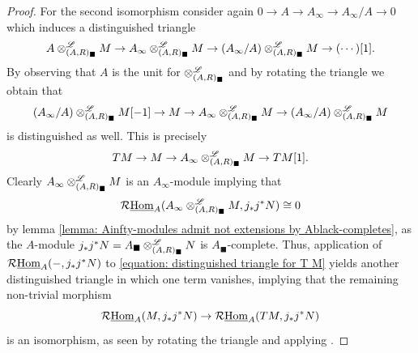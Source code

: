 \begin{proof}
	
	For the second isomorphism consider again $0\to A\to A_\infty\to A_\infty/A \to 0$ which induces a distinguished triangle
	$$A\otimes^{\mathscr{L}}_{(A, R)_\blacksquare} M\to A_\infty\otimes^{\mathscr{L}}_{(A, R)_\blacksquare} M \to (A_\infty/A) \otimes^{\mathscr{L}}_{(A, R)_\blacksquare} M \to (\cdots)[1].$$
	By observing that $A$ is the unit for $\otimes^{\mathscr{L}}_{(A, R)_\blacksquare}$ and by rotating the triangle we obtain that
	$$(A_\infty/A) \otimes^{\mathscr{L}}_{(A, R)_\blacksquare} M[-1] \to M \to A_\infty\otimes^{\mathscr{L}}_{(A, R)_\blacksquare} M \to (A_\infty/A) \otimes^{\mathscr{L}}_{(A, R)_\blacksquare} M$$
	is distinguished as well. This is precisely
	\begin{equation}
		\label{equation: distinguished triangle for T M}
		T M \to M \to A_\infty\otimes^{\mathscr{L}}_{(A, R)_\blacksquare} M \to T M[1].
	\end{equation}
	Clearly $A_\infty\otimes^{\mathscr{L}}_{(A, R)_\blacksquare} M$ is an $A_\infty$-module implying that
	$$\mathcal{R}{\underline{\operatorname{Hom}}}_A(A_\infty\otimes^{\mathscr{L}}_{(A, R)_\blacksquare} M, j_\ast j^\ast N)\cong 0$$
	by lemma \ref{lemma: Ainfty-modules admit not extensions by Ablack-completes}, as the $A$-module $j_\ast j^\ast N = A_\blacksquare\otimes^{\mathscr{L}}_{(A, R)_\blacksquare} N$ is $A_\blacksquare$-complete. Thus, application of $\mathcal{R}{\underline{\operatorname{Hom}}}_A(-, j_\ast j^\ast N)$ 
	to \ref{equation: distinguished triangle for T M} yields another distinguished triangle in which one term vanishes, implying that the remaining non-trivial morphism
		$$\mathcal{R}{\underline{\operatorname{Hom}}}_A(M, j_\ast j^\ast  N)\to \mathcal{R}{\underline{\operatorname{Hom}}}_A(T M, j_\ast j^\ast N)$$
	is an isomorphism, as seen by rotating the triangle and applying \cite[\href{https://stacks.math.columbia.edu/tag/05QR}{Tag 05QR}]{stacks-project}.
\end{proof}




